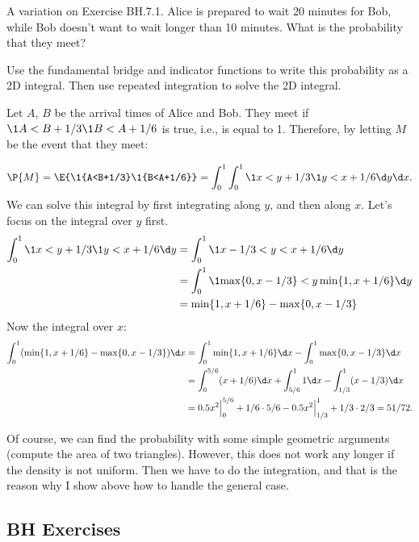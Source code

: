 \begin{exercise}
A variation on Exercise BH.7.1. Alice is prepared to wait 20 minutes for Bob, while Bob doesn't want to wait longer than 10 minutes. What is the probability that they meet?

Use the fundamental bridge and indicator functions to write this probability as a 2D integral. Then use repeated integration to solve the 2D integral.
\begin{solution}
Let $A$, $B$ be the arrival times of Alice and Bob. They meet if $\1{A<B+1/3}\1{B<A+1/6}$ is true, i.e., is equal to 1. Therefore, by letting $M$ be the event that they meet:

\begin{equation*}
\P{M} = \E{\1{A<B+1/3}\1{B<A+1/6}} = \int_0^1\int_0^1 \1{x<y+1/3}\1{y<x+1/6} \d y \d x.
\end{equation*}
We can solve this integral by first integrating along $y$, and then along $x$. Let's focus on the integral over $y$ first.
\begin{align*}
\int_0^1 \1{x<y+1/3}\1{y<x+1/6} \d y
&=\int_0^1 \1{x-1/3<y<x+1/6} \d y \\
&=\int_0^1 \1{\max\{0, x-1/3\} <y \min\{1,x+1/6\} } \d y \\
&= \min\{1,x+1/6\} - \max\{0, x-1/3\}
\end{align*}
Now the integral over $x$:
\begin{align*}
  \int_0^1 (\min\{1,x+1/6\} - \max\{0, x-1/3\}) \d x
&=  \int_0^1 \min\{1,x+1/6\}\d x - \int_0^{1}\max\{0, x-1/3\} \d x  \\
&=  \int_0^{5/6}(x+1/6)\d x + \int_{5/6}^{1}1 \d x
 - \int_{1/3}^{1}(x-1/3) \d x \\
  &=0.5 x^2\Big|_{0}^{5/6} + 1/6\cdot 5/6 - 0.5x^2\Big|_{1/3}^1 + 1/3\cdot 2/3 = 51/72.
\end{align*}

Of course, we can find the probability with some simple geometric arguments (compute the area of two triangles). However, this does not work any longer if the density is not uniform.  Then we have to do the integration, and that is the reason why I show above how to handle the general case.
\end{solution}
\end{exercise}

\subsection{BH Exercises}
\label{sec:bh-exercises-1}


